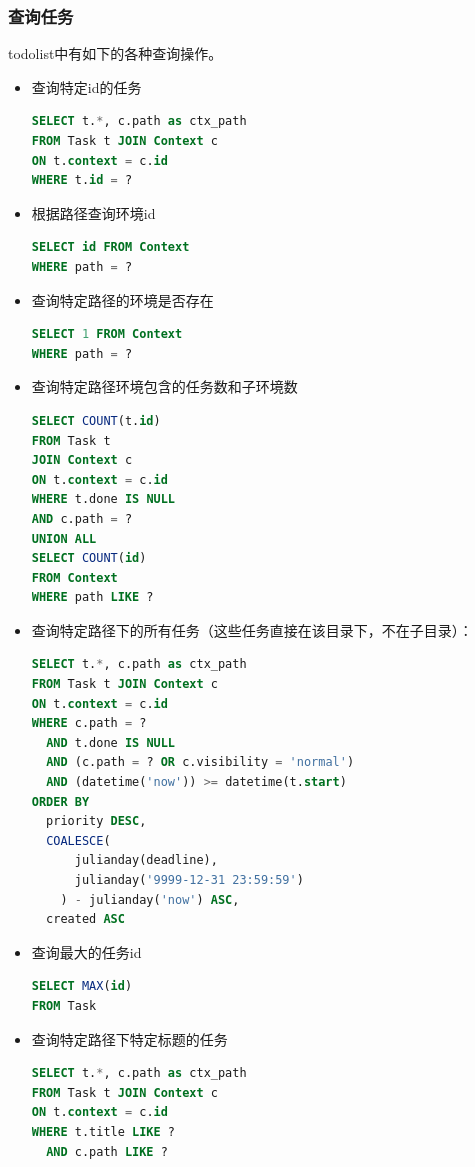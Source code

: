 \documentclass[a4paper, 11pt]{article}
\begin{document}
\subsubsection{查询任务}
\par todolist中有如下的各种查询操作。
\begin{itemize}
\item 查询特定id的任务
\begin{lstlisting}[language=SQL]
SELECT t.*, c.path as ctx_path
FROM Task t JOIN Context c
ON t.context = c.id
WHERE t.id = ?
\end{lstlisting}
\item 根据路径查询环境id
\begin{lstlisting}[language=SQL]
SELECT id FROM Context
WHERE path = ?
\end{lstlisting}
\item 查询特定路径的环境是否存在
\begin{lstlisting}[language=SQL]
SELECT 1 FROM Context
WHERE path = ?
\end{lstlisting}
\item 查询特定路径环境包含的任务数和子环境数
\begin{lstlisting}[language=SQL]
SELECT COUNT(t.id)
FROM Task t
JOIN Context c
ON t.context = c.id
WHERE t.done IS NULL
AND c.path = ?
UNION ALL
SELECT COUNT(id)
FROM Context
WHERE path LIKE ?
\end{lstlisting}
\item 查询特定路径下的所有任务（这些任务直接在该目录下，不在子目录）：
\begin{lstlisting}[language=SQL]
SELECT t.*, c.path as ctx_path
FROM Task t JOIN Context c
ON t.context = c.id
WHERE c.path = ?
  AND t.done IS NULL
  AND (c.path = ? OR c.visibility = 'normal')
  AND (datetime('now')) >= datetime(t.start)
ORDER BY
  priority DESC,
  COALESCE(
      julianday(deadline),
      julianday('9999-12-31 23:59:59')
    ) - julianday('now') ASC,
  created ASC
\end{lstlisting}
\item 查询最大的任务id
\begin{lstlisting}[language=SQL]
SELECT MAX(id)
FROM Task
\end{lstlisting}
\item 查询特定路径下特定标题的任务
\begin{lstlisting}[language=SQL]
SELECT t.*, c.path as ctx_path
FROM Task t JOIN Context c
ON t.context = c.id
WHERE t.title LIKE ?
  AND c.path LIKE ?
\end{lstlisting}
\end{itemize}
\end{document}

